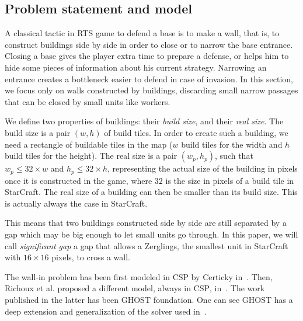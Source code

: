 \documentclass[journal]{IEEEtran}
\newcommand{\csp}{\textsc{CSP}\xspace}
\newcommand{\ghost}{\textsc{GHOST}\xspace}
\begin{document}
\subsection{Problem statement and model}

A classical tactic in RTS game to defend a base is to make a wall, that is,
to construct buildings side by side in order to close or to narrow the
base entrance. Closing a base gives the player extra time to prepare a
defense, or  helps him to  hide some  pieces of information  about his
current strategy. Narrowing an entrance creates a bottleneck easier to
defend in  case of  invasion. In  this section, we  focus  only on
walls constructed by buildings,  discarding small narrow passages that
can be closed by small units like workers.

We define  two properties  of buildings: their  {\em build  size}, and
their {\em  real size}.  The  build size is a  pair $(w, h)$  of build
tiles. In  order to  create such  a building, we  need a  rectangle of
buildable tiles  in the map  ($w$ build tiles for the width and  $h$ build
tiles for the height). The real size is a pair $(w_p, h_p)$, such that $w_p
\leq 32 \times w$ and $h_p  \leq 32 \times h$, representing the actual
size of  the building  in pixels  once it is  constructed in  the game,
where $32$  is the size  in pixels of a  build tile in  StarCraft. The
real size of a building can then  be smaller than its build size. This
is actually always the case in StarCraft.

This  means that  two buildings  constructed  side by  side are  still
separated by a gap  which may be big enough to  let small units go through.
In this paper, we  will call {\it
  significant gap} a gap that allows a Zerglings, the smallest unit in StarCraft with $16 \times 16$ pixels, to
cross a wall.

The  wall-in  problem has  been  first  modeled  in \csp  by  Certicky
in~\cite{Certicky13}. Then, Richoux et al. proposed a different model,
always  in \csp,  in~\cite{RichouxUO14}.   The work  published in  the
latter has  been \ghost  foundation.  One  can see  \ghost has  a deep
extension and generalization of the solver used in~\cite{RichouxUO14}.
\end{document}
